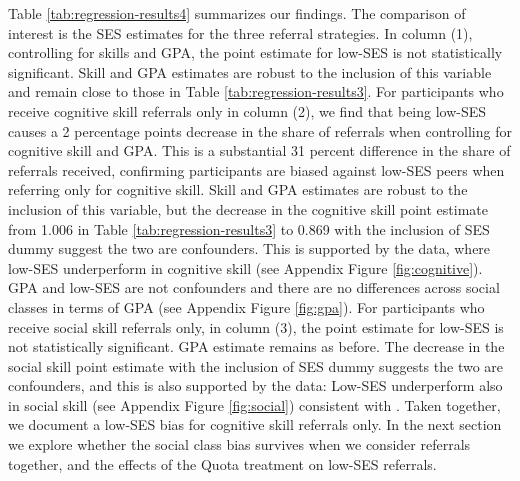 \documentclass[11pt,a4paper,oneside]{article}
\begin{document}
Table \ref{tab:regression-results4} summarizes our findings. The comparison of interest is the SES estimates for the three referral strategies. In column (1), controlling for skills and GPA, the point estimate for low-SES is not statistically significant. Skill and GPA estimates are robust to the inclusion of this variable and remain close to those in Table \ref{tab:regression-results3}. For participants who receive cognitive skill referrals only in column (2), we find that being low-SES causes a 2 percentage points decrease in the share of referrals when controlling for cognitive skill and GPA. This is a substantial 31 percent difference in the share of referrals received, confirming participants are biased against low-SES peers when referring only for cognitive skill. Skill and GPA estimates are robust to the inclusion of this variable, but the decrease in the cognitive skill point estimate from 1.006 in Table \ref{tab:regression-results3} to 0.869 with the inclusion of SES dummy suggest the two are confounders. This is supported by the data, where low-SES underperform in cognitive skill (see Appendix Figure \ref{fig:cognitive}). GPA and low-SES are not confounders and there are no differences across social classes in terms of GPA (see Appendix Figure \ref{fig:gpa}). For participants who receive social skill referrals only, in column (3), the point estimate for low-SES is not statistically significant. GPA estimate remains as before. The decrease in the social skill point estimate with the inclusion of SES dummy suggests the two are confounders, and this is also supported by the data: Low-SES underperform also in social skill (see Appendix Figure \ref{fig:social}) consistent with \citet{falk2021socioeconomic}. Taken together, we document a low-SES bias for cognitive skill referrals only. In the next section we explore whether the social class bias survives when we consider referrals together, and the effects of the Quota treatment on low-SES referrals.   
\end{document}
